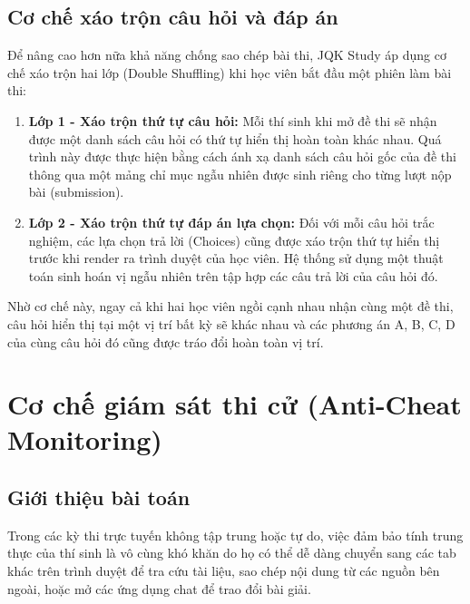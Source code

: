 \documentclass[../DoAn.tex]{subfiles}
\begin{document}
\subsection{Cơ chế xáo trộn câu hỏi và đáp án}
Để nâng cao hơn nữa khả năng chống sao chép bài thi, JQK Study áp dụng cơ chế xáo trộn hai lớp (Double Shuffling) khi học viên bắt đầu một phiên làm bài thi:
\begin{enumerate}
    \item \textbf{Lớp 1 - Xáo trộn thứ tự câu hỏi:} Mỗi thí sinh khi mở đề thi sẽ nhận được một danh sách câu hỏi có thứ tự hiển thị hoàn toàn khác nhau. Quá trình này được thực hiện bằng cách ánh xạ danh sách câu hỏi gốc của đề thi thông qua một mảng chỉ mục ngẫu nhiên được sinh riêng cho từng lượt nộp bài (submission).
    \item \textbf{Lớp 2 - Xáo trộn thứ tự đáp án lựa chọn:} Đối với mỗi câu hỏi trắc nghiệm, các lựa chọn trả lời (Choices) cũng được xáo trộn thứ tự hiển thị trước khi render ra trình duyệt của học viên. Hệ thống sử dụng một thuật toán sinh hoán vị ngẫu nhiên trên tập hợp các câu trả lời của câu hỏi đó. 
\end{enumerate}
Nhờ cơ chế này, ngay cả khi hai học viên ngồi cạnh nhau nhận cùng một đề thi, câu hỏi hiển thị tại một vị trí bất kỳ sẽ khác nhau và các phương án A, B, C, D của cùng câu hỏi đó cũng được tráo đổi hoàn toàn vị trí.

\section{Cơ chế giám sát thi cử (Anti-Cheat Monitoring)}
\label{section:5.2}

\subsection{Giới thiệu bài toán}
Trong các kỳ thi trực tuyến không tập trung hoặc tự do, việc đảm bảo tính trung thực của thí sinh là vô cùng khó khăn do họ có thể dễ dàng chuyển sang các tab khác trên trình duyệt để tra cứu tài liệu, sao chép nội dung từ các nguồn bên ngoài, hoặc mở các ứng dụng chat để trao đổi bài giải.
\end{document}
